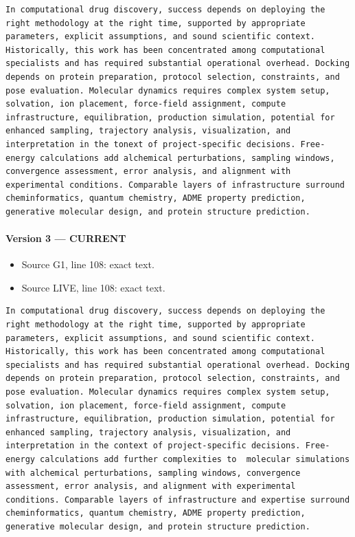 \documentclass[11pt]{article}
\begin{document}
\begin{lstlisting}
In computational drug discovery, success depends on deploying the right methodology at the right time, supported by appropriate parameters, explicit assumptions, and sound scientific context. Historically, this work has been concentrated among computational specialists and has required substantial operational overhead. Docking depends on protein preparation, protocol selection, constraints, and pose evaluation. Molecular dynamics requires complex system setup, solvation, ion placement, force-field assignment, compute infrastructure, equilibration, production simulation, potential for enhanced sampling, trajectory analysis, visualization, and interpretation in the tonext of project-specific decisions. Free-energy calculations add alchemical perturbations, sampling windows, convergence assessment, error analysis, and alignment with experimental conditions. Comparable layers of infrastructure surround cheminformatics, quantum chemistry, ADME property prediction, generative molecular design, and protein structure prediction.
\end{lstlisting}

\paragraph{Version 3 --- CURRENT}

\begin{itemize}[leftmargin=*]
\item Source G1, line 108: exact text.
\item Source LIVE, line 108: exact text.
\end{itemize}

\begin{lstlisting}
In computational drug discovery, success depends on deploying the right methodology at the right time, supported by appropriate parameters, explicit assumptions, and sound scientific context. Historically, this work has been concentrated among computational specialists and has required substantial operational overhead. Docking depends on protein preparation, protocol selection, constraints, and pose evaluation. Molecular dynamics requires complex system setup, solvation, ion placement, force-field assignment, compute infrastructure, equilibration, production simulation, potential for enhanced sampling, trajectory analysis, visualization, and interpretation in the context of project-specific decisions. Free-energy calculations add further complexities to  molecular simulations with alchemical perturbations, sampling windows, convergence assessment, error analysis, and alignment with experimental conditions. Comparable layers of infrastructure and expertise surround cheminformatics, quantum chemistry, ADME property prediction, generative molecular design, and protein structure prediction.
\end{lstlisting}
\end{document}
